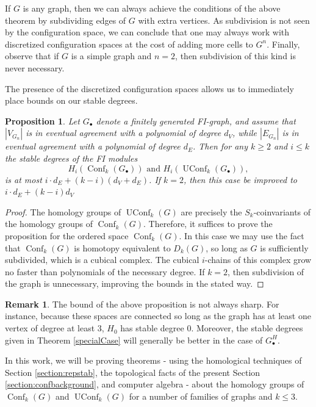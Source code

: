 \documentclass[12pt]{amsart}
\newtheorem{prop}[thm]{Proposition}
\theoremstyle{definition}
\newtheorem{rmk}[thm]{Remark}
\newcommand{\conf}{\operatorname{Conf}}
\newcommand{\uconf}{\operatorname{UConf}}
\begin{document}
If $G$ is any graph, then we can always achieve the conditions of the above theorem by subdividing edges of $G$ with extra vertices. As subdivision is not seen by the configuration space, we can conclude that one may always work with discretized configuration spaces at the cost of adding more cells to $G^n$. Finally, observe that if $G$ is a simple graph and $n = 2$, then subdivision of this kind is never necessary.

The presence of the discretized configuration spaces allows us to immediately place bounds on our stable degrees.

\begin{prop}
    Let $G_\bullet$ denote a finitely generated FI-graph, and assume that $|V_{G_n}|$ is in eventual agreement with a polynomial of degree $d_V$, while $|E_{G_n}|$ is in eventual agreement with a polynomial of degree $d_E$. Then for any $k \geq 2$ and $i \leq k$ the stable degrees of the FI modules
    \[
    H_i(\conf_k(G_\bullet)) \text{ and } H_i(\uconf_k(G_\bullet)),
    \]
    is at most $i \cdot d_E + (k-i)(d_V + d_E)$. If $k = 2$, then this case be improved to $i \cdot d_E + (k-i)d_V$
\end{prop}

\begin{proof}
    The homology groups of $\uconf_k(G)$ are precisely the $S_k$-coinvariants of the homology groups of $\conf_k(G)$. Therefore, it suffices to prove the proposition for the ordered space $\conf_k(G)$. In this case we may use the fact that $\conf_k(G)$ is homotopy equivalent to $D_k(G)$, so long as $G$ is sufficiently subdivided, which is a cubical complex. The cubical $i$-chains of this complex grow no faster than polynomials of the necessary degree. If $k = 2$, then subdivision of the graph is unnecessary, improving the bounds in the stated way.
\end{proof}

\begin{rmk}\label{rmk: H0 is triv}
    The bound of the above proposition is not always sharp. For instance, because these spaces are connected so long as the graph has at least one vertex of degree at least 3, $H_0$ has stable degree 0. Moreover, the stable degrees given in Theorem \ref{specialCase} will generally be better in the case of $G_\bullet^H$.
\end{rmk}


In this work, we will be proving theorems - using the homological techniques of Section \ref{section:repstab}, the topological facts of the present Section \ref{section:confbackground}, and computer algebra - about the homology groups of $\conf_k(G)$ and $\uconf_k(G)$ for a number of families of graphs and $k \leq 3$. 
\end{document}
